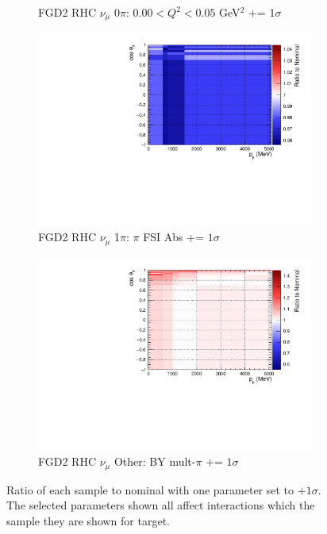 \begin{figure}[!htbp]
\begin{subfigure}{.32\textwidth}
  \caption{FGD2 RHC $\nu_{\mu}$ 0$\pi$: $0.00 < Q^2 < 0.05$ GeV$^2$ += $1\sigma$}
  \label{fig:sigvar_FGD2_NuMuBkg_CC0pi_in_AntiNu_Mode}
\end{subfigure}
\begin{subfigure}{.32\textwidth}
  \centering
  \includegraphics[width=0.85\linewidth]{figs/sig/FGD2_NuMuBkg_CC1pi_in_AntiNu_Mode_FEFABS_+1sig.pdf}
  \caption{FGD2 RHC $\nu_{\mu}$ 1$\pi$: $\pi$ FSI Abs += $1\sigma$}
  \label{fig:sigvar_FGD2_NuMuBkg_CC1pi_in_AntiNu_Mode}
\end{subfigure}
\begin{subfigure}{.32\textwidth}
  \centering
  \includegraphics[width=0.85\linewidth]{figs/sig/FGD2_NuMuBkg_CCOther_in_AntiNu_Mode_CC_BY_MPi_+1sig.pdf}
  \caption{FGD2 RHC $\nu_{\mu}$ Other: BY mult-$\pi$ += $1\sigma$}
  \label{fig:sigvar_FGD2_NuMuBkg_CCOther_in_AntiNu_Mode}
\end{subfigure}
\caption{Ratio of each sample to nominal with one parameter set to $+1\sigma$. The selected parameters shown all affect interactions which the sample they are shown for target.}
\label{fig:sigvars}
\end{figure}

